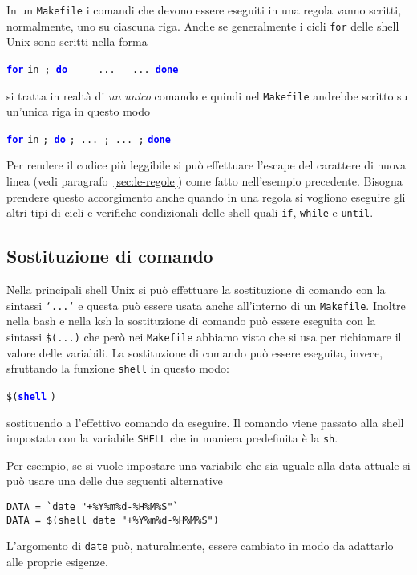 In un \texttt{Makefile} i comandi che devono essere eseguiti in una regola vanno
scritti, normalmente, uno su ciascuna riga.  Anche se generalmente i cicli
\texttt{for} delle shell Unix sono scritti nella forma
\begin{sintassi} \obeylines{}
  \small \texttt{\textcolor{blue}{\textbf{for}}}  \texttt{in}\
  \texttt{; \textcolor{blue}{\textbf{do}}}
  \texttt{\ \ }
  \texttt{\ \ ...
    \ \ ...
    \textcolor{blue}{\textbf{done}}}
\end{sintassi}
si tratta in realtà di \emph{un unico} comando e quindi nel \texttt{Makefile}
andrebbe scritto su un'unica riga in questo modo
\begin{sintassi}
  \small \texttt{\textcolor{blue}{\textbf{for}}}  \texttt{in}
  \meta{elenco}\texttt{; \textcolor{blue}{\textbf{do}}} \meta{comandi}
  \texttt{; ... ; ... ;} \texttt{\textcolor{blue}{\textbf{done}}}
\end{sintassi}
Per rendere il codice più leggibile si può effettuare l'escape del carattere di
nuova linea (vedi paragrafo~\ref{sec:le-regole}) come fatto nell'esempio
precedente.  Bisogna prendere questo accorgimento anche quando in una regola si
vogliono eseguire gli altri tipi di cicli e verifiche condizionali delle shell
quali \texttt{if}, \texttt{while} e \texttt{until}.

\subsection{Sostituzione di comando}
\label{sec:sostituzione-comando}

Nella principali shell Unix si può effettuare la sostituzione di comando con la
sintassi \texttt{`...`} e questa può essere usata anche all'interno di un
\texttt{Makefile}.  Inoltre nella bash e nella ksh la sostituzione di comando
può essere eseguita con la sintassi \texttt{\$(...)} che però nei
\texttt{Makefile} abbiamo visto che si usa per richiamare il valore delle
variabili.  La sostituzione di comando può essere eseguita, invece, sfruttando
la funzione \texttt{shell} in questo modo:
\begin{sintassi}
  \small \texttt{\$(\textcolor{blue}{\textbf{shell}}} \texttt{)}
\end{sintassi}
sostituendo a  l'effettivo comando da eseguire.  Il comando viene
passato alla shell impostata con la variabile \texttt{SHELL} che in maniera
predefinita è la \texttt{sh}.

Per esempio, se si vuole impostare una variabile che sia uguale alla data
attuale si può usare una delle due seguenti alternative
\begin{lstlisting}
DATA = `date "+%Y%m%d-%H%M%S"`
DATA = $(shell date "+%Y%m%d-%H%M%S")
\end{lstlisting} %
L'argomento di \texttt{date} può, naturalmente, essere cambiato in modo da
adattarlo alle proprie esigenze.

